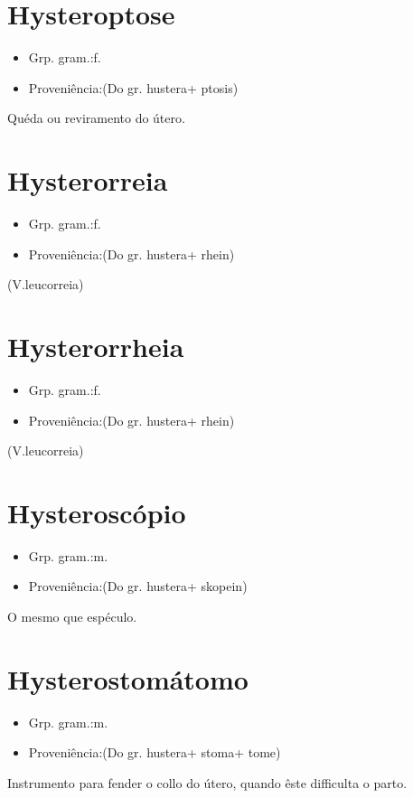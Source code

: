 \documentclass{article}
\begin{document}
\section{Hysteroptose}
\begin{itemize}
\item {Grp. gram.:f.}
\end{itemize}
\begin{itemize}
\item {Proveniência:(Do gr. \textunderscore hustera\textunderscore  + \textunderscore ptosis\textunderscore )}
\end{itemize}
Quéda ou reviramento do útero.
\section{Hysterorreia}
\begin{itemize}
\item {Grp. gram.:f.}
\end{itemize}
\begin{itemize}
\item {Proveniência:(Do gr. \textunderscore hustera\textunderscore  + \textunderscore rhein\textunderscore )}
\end{itemize}
(V.leucorreia)
\section{Hysterorrheia}
\begin{itemize}
\item {Grp. gram.:f.}
\end{itemize}
\begin{itemize}
\item {Proveniência:(Do gr. \textunderscore hustera\textunderscore  + \textunderscore rhein\textunderscore )}
\end{itemize}
(V.leucorreia)
\section{Hysteroscópio}
\begin{itemize}
\item {Grp. gram.:m.}
\end{itemize}
\begin{itemize}
\item {Proveniência:(Do gr. \textunderscore hustera\textunderscore  + \textunderscore skopein\textunderscore )}
\end{itemize}
O mesmo que \textunderscore espéculo\textunderscore .
\section{Hysterostomátomo}
\begin{itemize}
\item {Grp. gram.:m.}
\end{itemize}
\begin{itemize}
\item {Proveniência:(Do gr. \textunderscore hustera\textunderscore  + \textunderscore stoma\textunderscore  + \textunderscore tome\textunderscore )}
\end{itemize}
Instrumento para fender o collo do útero, quando êste difficulta o parto.
\end{document}
